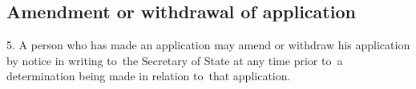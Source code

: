 \documentclass[12pt,a4paper]{article}
\begin{document}
%
%
%
%
%


\subsection[5. Amendment or withdrawal of application]{Amendment or withdrawal of application}

5. A person who has made an application
may amend or withdraw his application by notice in writing to~the Secretary of
State at any time prior to~a determination being made in relation to~that
application.
\end{document}
